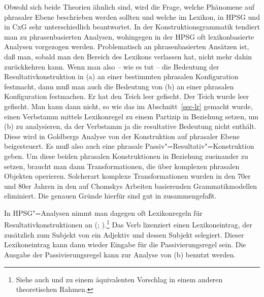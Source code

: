Obwohl sich beide Theorien ähnlich sind, wird die Frage, welche Phänomene auf phrasaler Ebene
beschrieben werden sollten und welche im Lexikon, in HPSG und in CxG sehr unterschiedlich
beantwortet. In der Konstruktionsgrammatik tendiert man zu phrasenbasierten Analysen, wohingegen in
der HPSG oft lexikonbasierte Analysen vorgezogen werden. Problematisch an phrasenbasierten Ansätzen ist, 
daß man, sobald man den Bereich des Lexikons verlassen hat, nicht mehr
dahin zurückkehren kann. Wenn man also -- wie es \citet{Goldberg95a} tut -- die Bedeutung
der Resultativkonstruktion in (a) an einer bestimmten phrasalen Konfiguration festmacht,
dann muß man auch die Bedeutung von (b) an einer phrasalen Konfiguration festmachen.
\eal
\label{bsp-res-passiv}
\ex Er hat den Teich leer gefischt.
\ex Der Teich wurde leer gefischt.
\zl
Man kann dann nicht, so wie das im Abschnitt~\ref{sec-lr} gemacht wurde, einen Verbstamm
mittels Lexikonregel zu einem Partizip in Beziehung setzen, um (b) zu analysieren,
da der Verbstamm ja die resultative Bedeutung nicht enthält. Diese wird in Goldbergs Analyse
von der Konstruktion auf phrasaler Ebene beigesteuert. Es muß also auch eine phrasale
Passiv"=Resultativ"=Konstruktion geben. Um diese beiden phrasalen Konstruktionen in Beziehung
zueinander zu setzen, braucht man dann Transformationen, die über komplexen phrasalen
Objekten operieren. Solcherart komplexe Transformationen wurden in den 70er und 80er Jahren
in den auf Chomskys Arbeiten basierenden Grammatikmodellen
eliminiert. Die genauen Gründe hierfür sind gut in  zusammengefaßt.

In HPSG"=Analysen nimmt man dagegen oft Lexikonregeln für Resultativkonstruktionen an
(\citealp{Wechsler97a,WN2001a,Verspoor97a}; \citealp[Kapitel~6]{Mueller2002b}).\footnote{
  Siehe auch  und
zu einem äquivalenten Vorschlag in einem
  anderen theoretischen Rahmen.%
}
Das Verb  lizenziert einen Lexikoneintrag, der zusätzlich zum Subjekt von 
ein Adjektiv und dessen Subjekt selegiert. Dieser Lexikoneintrag kann dann wieder Eingabe
für die Passivierungsregel sein. Die Ausgabe der Passivierungsregel kann zur Analyse von (b)
benutzt werden. 

